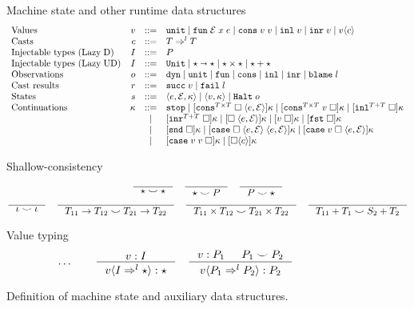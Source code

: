 \documentclass[acmsmall,review,anonymous]{acmart}\settopmatter{printfolios=true,printccs=false,printacmref=false}
\newcommand{\stxrule}[3]{\text{#2} & #1 & ::= & #3\\}
\newcommand{\stxrulecont}[1]{& & | & #1 \\}
\newcommand{\plus}[0]{+}
\newcommand{\lazyUD}{Lazy\;UD}
\newcommand{\lazyD}{Lazy\;D}
\newcommand{\sOOinspect}[3]{\langle#1,#2,#3\rangle}
\newcommand{\sOOreturn}[2]{\langle#1,#2\rangle}
\newcommand{\sOOhalt}[1]{\mathtt{Halt} \; #1}
\newcommand{\TOOdyn}[0]{\star}
\newcommand{\POOunit}[0]{\mathtt{Unit}}
\newcommand{\POOfun}[2]{#1 \shortrightarrow #2}
\newcommand{\POOprod}[2]{#1 \times #2}
\newcommand{\POOsum}[2]{#1 \plus #2}
\newcommand{\cOOcast}[3]{#1 \Rightarrow^{#2} #3}
\newcommand{\oOOinj}{\mathtt{dyn}}
\newcommand{\oOOsole}{\mathtt{unit}}
\newcommand{\oOOfun}{\mathtt{fun}}
\newcommand{\oOOcons}{\mathtt{cons}}
\newcommand{\oOOinl}{\mathtt{inl}}
\newcommand{\oOOinr}{\mathtt{inr}}
\newcommand{\oOOblame}[1]{\mathtt{blame} \; #1}
\newcommand{\vOOcast}[2]{#1\langle#2\rangle}
\newcommand{\vOOfun}[3]{\mathtt{fun} \; #1 \; #2 \; #3}
\newcommand{\vOOtt}[0]{\mathtt{unit}}
\newcommand{\vOOcons}[2]{\mathtt{cons}\;#1\;#2}
\newcommand{\vOOinl}[1]{\mathtt{inl}\;#1}
\newcommand{\vOOinr}[1]{\mathtt{inr}\;#1}
\newcommand{\rOOsucc}[1]{\mathtt{succ}\;#1}
\newcommand{\rOOfail}[1]{\mathtt{fail}\;#1}
\newcommand{\kOOmt}[0]{\mathtt{stop}}
\newcommand{\kOOconsI}[5]{
	[\mathtt{cons}^{\POOprod{#1}{#2}} \; \square \; \langle#3,#4\rangle ]#5}
\newcommand{\kOOconsII}[4]{
	[\mathtt{cons}^{\POOprod{#1}{#2}} \; #3 \; \square]#4}
\newcommand{\kOOinl}[3]{[\mathtt{inl}^{\POOsum{#1}{#2}}\; \square]#3}
\newcommand{\kOOinr}[3]{[\mathtt{inr}^{\POOsum{#1}{#2}}\; \square]#3}
\newcommand{\kOOappI}[3]{
  [\square \; \langle#1,#2\rangle]#3
}
\newcommand{\kOOappII}[2]{
  [#1 \; \square]#2}
\newcommand{\kOOcar}[1]{[\mathtt{fst} \; \square]#1}
\newcommand{\kOOcdr}[1]{[\mathtt{snd} \; \square]#1}
\newcommand{\kOOcaseI}[4]{
  [\mathtt{case} \; \square \; \langle#1,#3\rangle \; \langle#2,#3\rangle ]#4}
\newcommand{\kOOcaseII}[4]{
  [\mathtt{case} \; #1 \; \square \; \langle#2,#3\rangle ]#4}
\newcommand{\kOOcaseIII}[3]{
  [\mathtt{case} \; #1 \; #2 \; \square]#3}
\newcommand{\kOOcast}[2]{
  [\square \langle #1 \rangle]#2}
\begin{document}
\begin{figure}
  Machine state and other runtime data structures
  \[
  \begin{array}{lrcl}
  \stxrule{v}{Values}{
    \vOOtt{} \mid
    \vOOfun{\mathcal{E}}{x}{e} \mid
    \vOOcons{v}{v} \mid
    \vOOinl{v} \mid
    \vOOinr{v} \mid   
    \vOOcast{v}{c}
  }
  \stxrule{c}{Casts}{
    \cOOcast{T}{l}{T}
  }
  \stxrule{I}{Injectable types (\lazyD)}{
    P
  }
  \stxrule{I}{Injectable types (\lazyUD)}{
    \POOunit \mid
    \POOfun{\star}{\star} \mid
    \star \times \star \mid
    \star + \star
  }
  \stxrule{o}{Observations}{
    \oOOinj \mid
    \oOOsole \mid
    \oOOfun \mid
    \oOOcons \mid
    \oOOinl \mid
    \oOOinr \mid
    \oOOblame{l}
  }
  \stxrule{r}{Cast results}{
    \rOOsucc{v} \mid
    \rOOfail{l}
  }
  \stxrule{s}{States}{
    \sOOinspect{e}{\mathcal{E}}{\kappa} \mid{}
    \sOOreturn{v}{\kappa} \mid{}
    \sOOhalt{o}
  }
  \stxrule{\kappa}{Continuations}{
    \kOOmt \mid
    \kOOconsI{T}{T}{e}{\mathcal{E}}{\kappa} \mid
    \kOOconsII{T}{T}{v}{\kappa} \mid
    \kOOinl{T}{T}{\kappa}
  }
  \stxrulecont{
    \kOOinr{T}{T}{\kappa} \mid
    \kOOappI{e}{\mathcal{E}}{\kappa} \mid
    \kOOappII{v}{\kappa} \mid
    \kOOcar{\kappa}
  }
  \stxrulecont{ 
    \kOOcdr{\kappa}\mid
    \kOOcaseI{e}{e}{\mathcal{E}}{\kappa}\mid
    \kOOcaseII{v}{e}{\mathcal{E}}{\kappa}
  }
  \stxrulecont{
    \kOOcaseIII{v}{v}{\kappa} \mid
    \kOOcast{c}{\kappa}
  }
  \end{array}
  \]

        Shallow-consistency
  \begin{gather*}
  \inference{}{
    \star \smile \star
  } \quad
  \inference{}{
    \star \smile P
  } \quad
  \inference{}{
    P \smile \star
  } \\
  \inference{}{
    \iota \smile \iota
  } \quad
  \inference{}{
    T_{11} \rightarrow T_{12} \smile T_{21} \rightarrow T_{22}
  } \quad
  \inference{}{
    T_{11} \times T_{12} \smile T_{21} \times T_{22}
  } \quad
  \inference{}{
  T_{11} \plus T_1 \smile S_2 \plus T_2
  }
  \end{gather*}
  
  Value typing 
  \begin{gather*}
  \dots \qquad
  \inference{
    v : I
  }{
    \vOOcast{v}{\cOOcast{I}{l}{\TOOdyn}} : \TOOdyn
  }
  \quad
  \inference{
    v : P_1 &
    P_1 \smile P_2
  }{
    \vOOcast{v}{\cOOcast{P_1}{l}{P_2}} : P_2
  }
  \end{gather*}
        \caption{Definition of machine state and auxiliary data
          structures.}
        \label{fig:state}
\end{figure}
\end{document}
